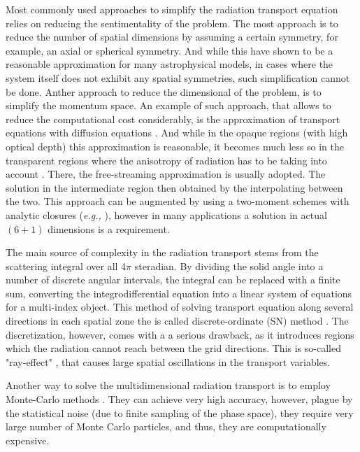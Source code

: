 \documentclass[11pt,a4paper,headinclude=true,DIV=14,BCOR=8mm,chapterprefix,listof=totoc,twoside,openright,abstracton]{scrbook}
\begin{document}
Most commonly used approaches to simplify the radiation transport equation relies on reducing the sentimentality of the problem. The most approach is to reduce the number of spatial dimensions by assuming a certain symmetry, for example, an axial or spherical symmetry. And while this have shown to be a reasonable approximation for many astrophysical models, in cases where the system itself does not exhibit any spatial symmetries, such simplification cannot be done. Anther approach to reduce the dimensional of the problem, is to simplify the momentum space. An example of such approach, that allows to reduce the computational cost considerably, is the approximation of transport equations with diffusion equations \cite{Pomraning:1973,Roe:1981}. And while in the opaque regions (with high optical depth) this approximation is reasonable, it becomes much less so in the transparent regions where the anisotropy of radiation has to be taking into account \cite{Ott:2008jb}. There, the free-streaming approximation is usually adopted. The solution in the intermediate region then obtained by the interpolating between the two. This approach can be augmented by using a two-moment schemes with analytic closures (\textit{e.g.,} \cite{Brunner:2002}), however in many applications a solution in actual $(6+1)$ dimensions is a requirement.

The main source of complexity in the radiation transport stems from the scattering integral over all 4$\pi$ steradian. By dividing the solid angle into a number of discrete angular intervals, the integral can be replaced with a finite sum, converting the integrodifferential equation into a linear system of equations for a multi-index object. This method of solving transport equation along several directions in each spatial zone the is called discrete-ordinate (SN) method \cite{Castor:2004,Ott:2008jb,Sumiyoshi:2012za,Godoy:2012}. The discretization, however, comes with a a serious drawback, as it introduces regions which the radiation cannot reach between the grid directions. This is so-called "ray-effect" \cite{Morel:2003}, that causes large spatial oscillations in the transport variables.

Another way to solve the multidimensional radiation transport is to employ Monte-Carlo methods \cite{Fleck:1971,Gentile:2009,Abdikamalov:2012zi}. They can achieve very high accuracy, however, plague by the statistical noise (due to finite sampling of the phase space), they require very large number of Monte Carlo particles, and thus, they are computationally expensive. 
\end{document}
